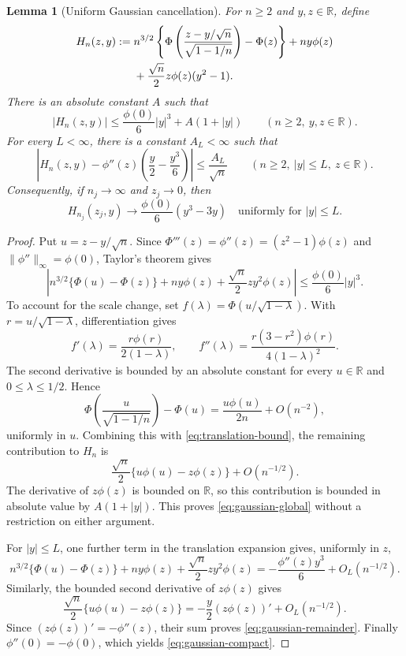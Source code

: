 \documentclass[aop]{imsart}
\theoremstyle{plain}
\newtheorem{lemma}[theorem]{Lemma}
\theoremstyle{definition}
\theoremstyle{definition}
\newcommand{\R}{\mathbb R}
\begin{document}
\begin{lemma}[Uniform Gaussian cancellation]
\label{lem:gaussian-expansion}
For \(n\ge2\) and \(y,z\in\R\), define
\begin{align}
H_n(z,y):={}&n^{3/2}
\left\{\Phi\left(\frac{z-y/\sqrt n}{\sqrt{1-1/n}}\right)-\Phi(z)\right\}
+ny\phi(z)\notag\\
&+\frac{\sqrt n}{2}z\phi(z)(y^2-1).\label{eq:gaussian-H}
\end{align}
There is an absolute constant \(A\) such that
\begin{equation}
\label{eq:gaussian-global}
|H_n(z,y)|\le\frac{\phi(0)}6|y|^3+A(1+|y|)
\qquad(n\ge2,\ y,z\in\R).
\end{equation}
For every \(L<\infty\), there is a constant \(A_L<\infty\) such that
\begin{equation}
\label{eq:gaussian-remainder}
\left|H_n(z,y)-\phi''(z)\left(\frac y2-\frac{y^3}{6}\right)\right|
\le\frac{A_L}{\sqrt n}
\qquad(n\ge2,\ |y|\le L,\ z\in\R).
\end{equation}
Consequently, if \(n_j\to\infty\) and \(z_j\to0\), then
\begin{equation}
\label{eq:gaussian-compact}
H_{n_j}(z_j,y)\longrightarrow\frac{\phi(0)}6(y^3-3y)
\quad\text{uniformly for }|y|\le L.
\end{equation}
\end{lemma}

\begin{proof}
Put \(u=z-y/\sqrt n\). Since
\(\Phi'''(z)=\phi''(z)=(z^2-1)\phi(z)\) and
\(\|\phi''\|_\infty=\phi(0)\), Taylor's theorem gives
\begin{equation}
\label{eq:translation-bound}
\left|n^{3/2}\{\Phi(u)-\Phi(z)\}
+ny\phi(z)+\frac{\sqrt n}{2}zy^2\phi(z)\right|
\le\frac{\phi(0)}6|y|^3.
\end{equation}
To account for the scale change, set
\(f(\lambda)=\Phi(u/\sqrt{1-\lambda})\). With
\(r=u/\sqrt{1-\lambda}\), differentiation gives
\[
f'(\lambda)=\frac{r\phi(r)}{2(1-\lambda)},\qquad
f''(\lambda)=\frac{r(3-r^2)\phi(r)}{4(1-\lambda)^2}.
\]
The second derivative is bounded by an absolute constant for every
\(u\in\R\) and \(0\le\lambda\le1/2\). Hence
\[
\Phi\left(\frac{u}{\sqrt{1-1/n}}\right)-\Phi(u)
=\frac{u\phi(u)}{2n}+O(n^{-2}),
\]
uniformly in \(u\). Combining this with \eqref{eq:translation-bound},
the remaining contribution to \(H_n\) is
\[
\frac{\sqrt n}{2}\{u\phi(u)-z\phi(z)\}+O(n^{-1/2}).
\]
The derivative of \(z\phi(z)\) is bounded on \(\R\), so this contribution
is bounded in absolute value by \(A(1+|y|)\). This proves
\eqref{eq:gaussian-global} without a restriction on either argument.

For \(|y|\le L\), one further term in the translation expansion gives,
uniformly in \(z\),
\[
n^{3/2}\{\Phi(u)-\Phi(z)\}
+ny\phi(z)+\frac{\sqrt n}{2}zy^2\phi(z)
=-\frac{\phi''(z)y^3}{6}+O_L(n^{-1/2}).
\]
Similarly, the bounded second derivative of \(z\phi(z)\) gives
\[
\frac{\sqrt n}{2}\{u\phi(u)-z\phi(z)\}
=-\frac y2(z\phi(z))'+O_L(n^{-1/2}).
\]
Since \((z\phi(z))'=-\phi''(z)\), their sum proves
\eqref{eq:gaussian-remainder}. Finally \(\phi''(0)=-\phi(0)\), which yields
\eqref{eq:gaussian-compact}.
\end{proof}
\end{document}
